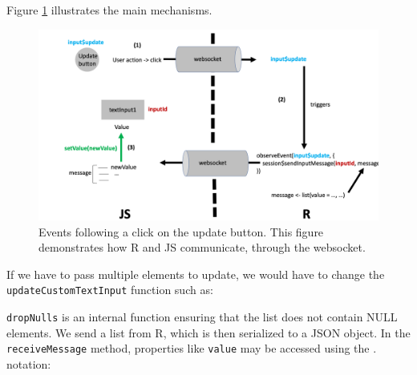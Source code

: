 \documentclass[
]{book}
\newenvironment{Shaded}{\begin{snugshade}}{\end{snugshade}}
\newcommand{\ControlFlowTok}[1]{\textcolor[rgb]{0.13,0.29,0.53}{\textbf{#1}}}
\newcommand{\DataTypeTok}[1]{\textcolor[rgb]{0.13,0.29,0.53}{#1}}
\newcommand{\KeywordTok}[1]{\textcolor[rgb]{0.13,0.29,0.53}{\textbf{#1}}}
\newcommand{\NormalTok}[1]{#1}
\newcommand{\OperatorTok}[1]{\textcolor[rgb]{0.81,0.36,0.00}{\textbf{#1}}}
\newcommand{\OtherTok}[1]{\textcolor[rgb]{0.56,0.35,0.01}{#1}}
\newcommand{\StringTok}[1]{\textcolor[rgb]{0.31,0.60,0.02}{#1}}
\begin{document}
Figure \ref{fig:shiny-update-inputs} illustrates the main mechanisms.

\begin{figure}
\includegraphics[width=20in]{images/survival-kit/shiny-update-inputs} \caption{Events following a click on the update button. This figure demonstrates how R and JS communicate, through the websocket.}\label{fig:shiny-update-inputs}
\end{figure}

If we have to pass multiple elements to update, we would have to change the \texttt{updateCustomTextInput} function such as:

\begin{Shaded}
\end{Shaded}

\texttt{dropNulls} is an internal function ensuring that the list does not contain NULL elements. We send a list from R, which is then serialized to a JSON object. In the \texttt{receiveMessage} method, properties like \texttt{value} may be accessed using the . notation:
\end{document}
